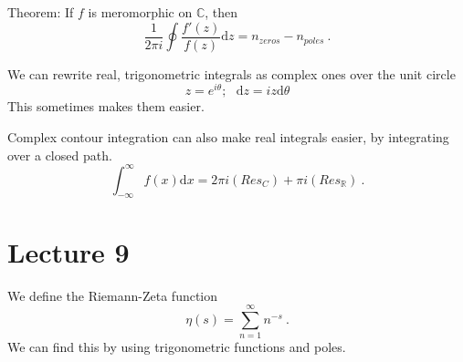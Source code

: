 \documentclass[11pt, a4paper]{Article}
\begin{document}
Theorem: If $f$ is meromorphic on $\mathbb{C}$, then
$$
	\frac{1}{2\pi i} \oint \frac{f'(z)}{f(z)}\mathrm{d}z = n_{zeros} - n_{poles}~.
$$

We can rewrite real, trigonometric integrals as complex ones over the unit circle
$$
	z = e^{i\theta}; ~ ~ ~ \mathrm{d}z = iz\mathrm{d}\theta 
$$
This sometimes makes them easier.

Complex contour integration can also make real integrals easier, by integrating over a closed path.
$$
	\int^\infty_{-\infty} f(x)\mathrm{d}x = 2\pi i (Res_C) + \pi i (Res_\mathbb{R})~.
$$

\section{Lecture 9}

We define the Riemann-Zeta function
$$
	\eta(s) = \sum^\infty_{n=1} n^{-s}~.
$$
We can find this by using trigonometric functions and poles.
\end{document}
